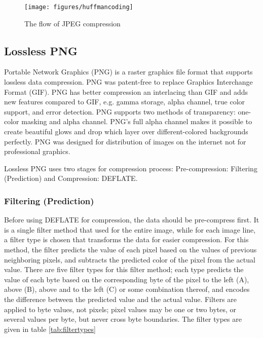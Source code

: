 \begin{figure}[hbt]
  \center
        \texttt{[image: figures/huffmancoding]}
        \caption{The flow of JPEG compression}
  \label{fig:huffmancoding}
\end{figure}

\subsection{Lossless PNG}

Portable Network Graphics (PNG) \cite{png} is a raster graphics file format that supports lossless data compression. PNG was patent-free to replace Graphics Interchange Format (GIF). PNG has better compression an interlacing than GIF and adds new features compared to GIF, e.g. gamma storage, alpha channel, true color support, and error detection. PNG supports two methods of transparency: one-color masking and alpha channel. PNG's full alpha channel makes it possible to create beautiful glows and drop which layer over different-colored backgrounds perfectly. PNG was designed for distribution of images on the internet not for professional graphics.

Lossless PNG uses two stages for compression process: Pre-compression: Filtering (Prediction) and Compression: DEFLATE.

\subsubsection{Filtering (Prediction)}
Before using DEFLATE for compression, the data should be pre-compress first. It is a single filter method that used for the entire image, while for each image line, a filter type is chosen that transforms the data for easier compression. For this method, the filter predicts the value of each pixel based on the values of previous neighboring pixels, and subtracts the predicted color of the pixel from the actual value. There are five filter types for this filter method; each type predicts the value of each byte based on the corresponding byte of the pixel to the left (A), above (B), above and to the left (C) or some combination thereof, and encodes the difference between the predicted value and the actual value. Filters are applied to byte values, not pixels; pixel values may be one or two bytes, or several values per byte, but never cross byte boundaries. The filter types are given in table \ref{tab:filtertypes}

